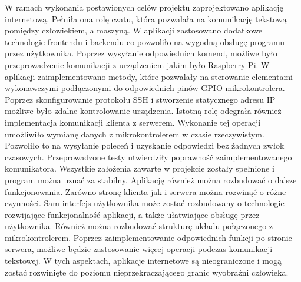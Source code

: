 
W ramach wykonania postawionych celów projektu zaprojektowano aplikację internetową. Pełniła ona rolę czatu, która pozwalała na komunikację tekstową pomiędzy człowiekiem, a maszyną. W aplikacji zastosowano dodatkowe technologie frontendu i backendu co pozwoliło na wygodną obsługę programu przez użytkownika. Poprzez wysyłanie odpowiednich komend, możliwe było przeprowadzenie komunikacji z urządzeniem jakim było Raspberry Pi. W aplikacji zaimplementowano metody, które pozwalały na sterowanie elementami wykonawczymi podłączonymi do odpowiednich pinów GPIO mikrokontrolera. Poprzez skonfigurowanie protokołu SSH i stworzenie statycznego adresu IP możliwe było zdalne kontrolowanie urządzenia. Istotną rolę odegrała również implementacja komunikacji klienta z serwerem. Wykonanie tej operacji umożliwiło wymianę danych z mikrokontrolerem w czasie rzeczywistym. Pozwoliło to na wysyłanie poleceń i uzyskanie odpowiedzi bez żadnych zwłok czasowych. Przeprowadzone testy utwierdziły poprawność zaimplementowanego komunikatora. Wszystkie założenia zawarte w projekcie zostały spełnione i program można uznać za stabilny. Aplikację również można rozbudować o dalsze funkcjonowania. Zarówno stronę klienta jak i serwera można rozwinąć o różne czynności. Sam interfejs użytkownika może zostać rozbudowany o technologie rozwijające funkcjonalność aplikacji, a także ułatwiające obsługę przez użytkownika. Również można rozbudować strukturę układu połączonego z mikrokontrolerem. Poprzez zaimplementowanie odpowiednich funkcji po stronie serwera, możliwe będzie zastosowanie więcej operacji podczas komunikacji tekstowej. W tych aspektach, aplikacje internetowe są nieograniczone i mogą zostać rozwinięte do poziomu nieprzekraczającego granic wyobraźni człowieka.